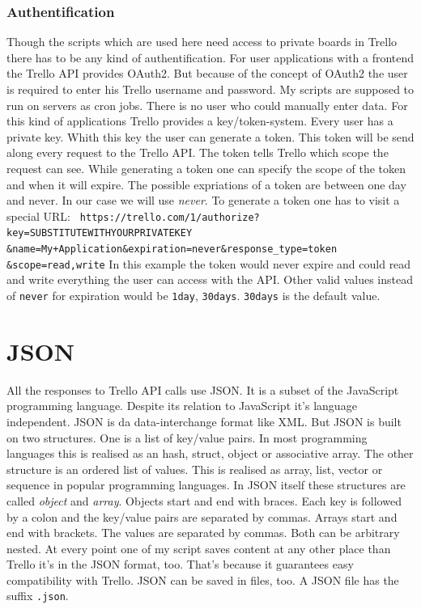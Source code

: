 \subsubsection{Authentification}
Though the scripts which are used here need access to private boards in Trello there has to be any kind of authentification. For user applications with a frontend the Trello API provides OAuth2. But because of the concept of OAuth2 the user is required to enter his Trello username and password. \cite{oauth} My scripts are supposed to run on servers as cron jobs. There is no user who could manually enter data. For this kind of applications Trello provides a key/token-system. Every user has a private key. Whith this key the user can generate a token. This token will be send along every request to the Trello API. The token tells Trello which scope the request can see. While generating a token one can specify the scope of the token and when it will expire. The possible expriations of a token are between one day and never. In our case we will use \emph{never}. To generate a token one has to visit a special URL:
\texttt{
https://trello.com/1/authorize?key=SUBSTITUTEWITHYOURPRIVATEKEY \&name=My+Application\&expiration=never\&response\_type=token \&scope=read,write}
In this example the token would never expire and could read and write everything the user can access with the API. Other valid values instead of \texttt{never} for expiration would be \texttt{1day}, \texttt{30days}. \texttt{30days} is the default value. \cite{trello:gettingstarted}

\section{JSON}
All the responses to Trello API calls use JSON. It is a subset of the JavaScript programming language. Despite its relation to JavaScript it's language independent. JSON is da data-interchange format like XML. But JSON is built on two structures. One is a list of key/value pairs. In most programming languages this is realised as an hash, struct, object or associative array. The other structure is an ordered list of values. This is realised as array, list, vector or sequence in popular programming languages. In JSON itself these structures are called \emph{object} and \emph{array}. Objects start and end with braces. Each key is followed by a colon and the key/value pairs are separated by commas. Arrays start and end with brackets. The values are separated by commas. Both can be arbitrary nested. At every point one of my script saves content at any other place than Trello it's in the JSON format, too. That's because it guarantees easy compatibility with Trello. JSON can be saved in files, too. A JSON file has the suffix \texttt{.json}. \cite{json}

